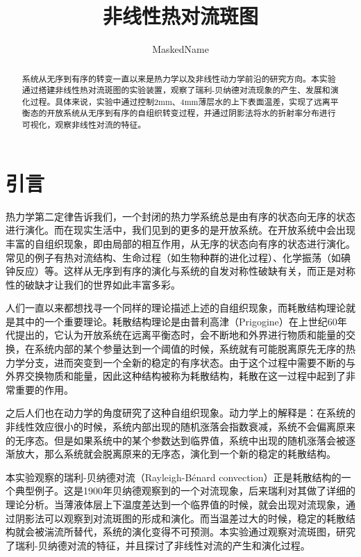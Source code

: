 \documentclass[font=default]{mpltx}
\begin{document}
\title{非线性热对流斑图} %
\author{MaskedName} %
\date{}

\begin{abstract}
  系统从无序到有序的转变一直以来是热力学以及非线性动力学前沿的研究方向。本实验通过搭建非线性热对流斑图的实验装置，观察了瑞利-贝纳德对流现象的产生、发展和演化过程。具体来说，实验中通过控制2mm、4mm薄层水的上下表面温差，实现了远离平衡态的开放系统从无序到有序的自组织转变过程，并通过阴影法将水的折射率分布进行可视化，观察非线性对流的特征。
\end{abstract}

\maketitle

\section{引言}
热力学第二定律告诉我们，一个封闭的热力学系统总是由有序的状态向无序的状态进行演化。而在现实生活中，我们见到的更多的是开放系统。在开放系统中会出现丰富的自组织现象，即由局部的相互作用，从无序的状态向有序的状态进行演化。常见的例子有热对流结构、生命过程（如生物种群的进化过程）、化学振荡（如碘钟反应）等。这样从无序到有序的演化与系统的自发对称性破缺有关，而正是对称性的破缺才让我们的世界如此丰富多彩。

人们一直以来都想找寻一个同样的理论描述上述的自组织现象，而耗散结构理论就是其中的一个重要理论。耗散结构理论是由普利高津（Prigogine）在上世纪60年代提出的，它认为开放系统在远离平衡态时，会不断地和外界进行物质和能量的交换，在系统内部的某个参量达到一个阈值的时候，系统就有可能脱离原先无序的热力学分支，进而突变到一个全新的稳定的有序状态。由于这个过程中需要不断的与外界交换物质和能量，因此这种结构被称为耗散结构，耗散在这一过程中起到了非常重要的作用。

之后人们也在动力学的角度研究了这种自组织现象。动力学上的解释是：在系统的非线性效应很小的时候，系统内部出现的随机涨落会指数衰减，系统不会偏离原来的无序态。但是如果系统中的某个参数达到临界值，系统中出现的随机涨落会被逐渐放大，那么系统就会脱离原来的无序态，演化到一个新的稳定的耗散结构。

本实验观察的瑞利-贝纳德对流（Rayleigh-Bénard convection）正是耗散结构的一个典型例子。这是1900年贝纳德观察到的一个对流现象，后来瑞利对其做了详细的理论分析。当薄液体层上下温度差达到一个临界值的时候，就会出现对流现象，通过阴影法可以观察到对流斑图的形成和演化。而当温差过大的时候，稳定的耗散结构就会被湍流所替代，系统的演化变得不可预测。本实验通过观察对流斑图，研究了瑞利-贝纳德对流的特征，并且探讨了非线性对流的产生和演化过程。
\end{document}

